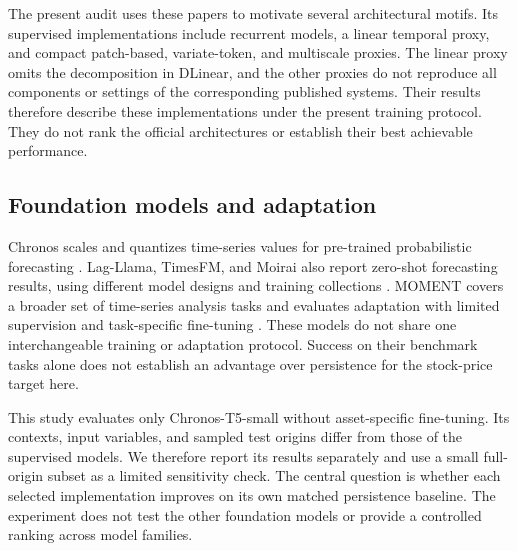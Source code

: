 The present audit uses these papers to motivate several architectural motifs. Its supervised implementations include recurrent models, a linear temporal proxy, and compact patch-based, variate-token, and multiscale proxies. The linear proxy omits the decomposition in DLinear, and the other proxies do not reproduce all components or settings of the corresponding published systems. Their results therefore describe these implementations under the present training protocol. They do not rank the official architectures or establish their best achievable performance.

\subsection{Foundation models and adaptation}

Chronos scales and quantizes time-series values for pre-trained probabilistic forecasting \cite{ansari2024chronos}. Lag-Llama, TimesFM, and Moirai also report zero-shot forecasting results, using different model designs and training collections \cite{rasul2023lagllama,das2024timesfm,woo2024moirai}. MOMENT covers a broader set of time-series analysis tasks and evaluates adaptation with limited supervision and task-specific fine-tuning \cite{goswami2024moment}. These models do not share one interchangeable training or adaptation protocol. Success on their benchmark tasks alone does not establish an advantage over persistence for the stock-price target here.

This study evaluates only Chronos-T5-small without asset-specific fine-tuning. Its contexts, input variables, and sampled test origins differ from those of the supervised models. We therefore report its results separately and use a small full-origin subset as a limited sensitivity check. The central question is whether each selected implementation improves on its own matched persistence baseline. The experiment does not test the other foundation models or provide a controlled ranking across model families.
